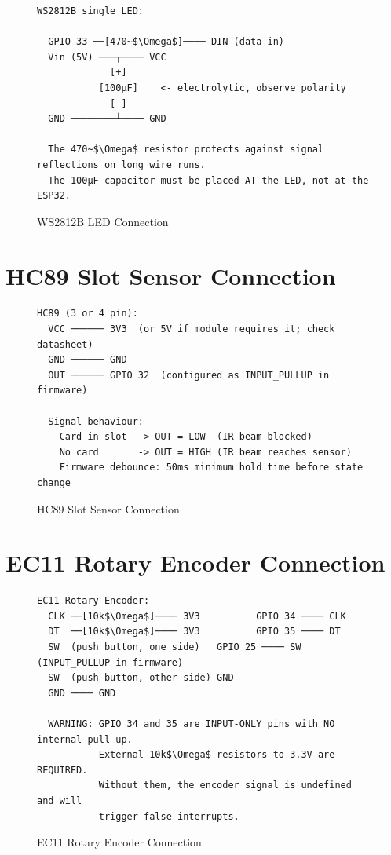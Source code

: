\begin{figure}[H]
\centering
\begin{verbatim}
WS2812B single LED:

  GPIO 33 ──[470~$\Omega$]──── DIN (data in)
  Vin (5V) ───┬──── VCC
             [+]
           [100µF]    <- electrolytic, observe polarity
             [-]
  GND ────────┴──── GND

  The 470~$\Omega$ resistor protects against signal reflections on long wire runs.
  The 100µF capacitor must be placed AT the LED, not at the ESP32.
\end{verbatim}
\caption{WS2812B LED Connection}
\label{fig:wiring_ws2812}
\end{figure}

\section{HC89 Slot Sensor Connection}

\begin{figure}[H]
\centering
\begin{verbatim}
HC89 (3 or 4 pin):
  VCC ────── 3V3  (or 5V if module requires it; check datasheet)
  GND ────── GND
  OUT ────── GPIO 32  (configured as INPUT_PULLUP in firmware)

  Signal behaviour:
    Card in slot  -> OUT = LOW  (IR beam blocked)
    No card       -> OUT = HIGH (IR beam reaches sensor)
    Firmware debounce: 50ms minimum hold time before state change
\end{verbatim}
\caption{HC89 Slot Sensor Connection}
\label{fig:wiring_hc89}
\end{figure}

\section{EC11 Rotary Encoder Connection}

\begin{figure}[H]
\centering
\begin{verbatim}
EC11 Rotary Encoder:
  CLK ──[10k$\Omega$]──── 3V3          GPIO 34 ──── CLK
  DT  ──[10k$\Omega$]──── 3V3          GPIO 35 ──── DT
  SW  (push button, one side)   GPIO 25 ──── SW  (INPUT_PULLUP in firmware)
  SW  (push button, other side) GND
  GND ──── GND

  WARNING: GPIO 34 and 35 are INPUT-ONLY pins with NO internal pull-up.
           External 10k$\Omega$ resistors to 3.3V are REQUIRED.
           Without them, the encoder signal is undefined and will
           trigger false interrupts.
\end{verbatim}
\caption{EC11 Rotary Encoder Connection}
\label{fig:wiring_encoder}
\end{figure}

